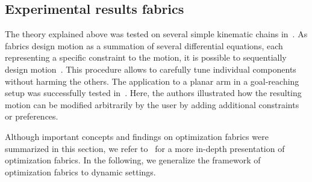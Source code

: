 \subsection{Experimental results fabrics}%
\label{sub:experimental_results_fabrics}

The theory explained above was tested on several simple kinematic chains
in~\cite{Ratliff2020,Ratliff2021}. As fabrics design motion as a summation of several
differential equations, each representing a specific constraint to the motion, it is
possible to sequentially design motion~\cite{Ratliff2020}. This procedure allows to
carefully tune individual components without harming the others. The application to a
planar arm in a goal-reaching setup was successfully tested in~\cite{Ratliff2020}. Here,
the authors illustrated how the resulting motion can be modified arbitrarily by the user
by adding additional constraints or preferences.

Although important concepts and findings on optimization fabrics were summarized in this
section, we refer to~\cite{Ratliff2020} for a more in-depth presentation of optimization
fabrics. In the following, we generalize the framework of optimization fabrics to dynamic settings.
